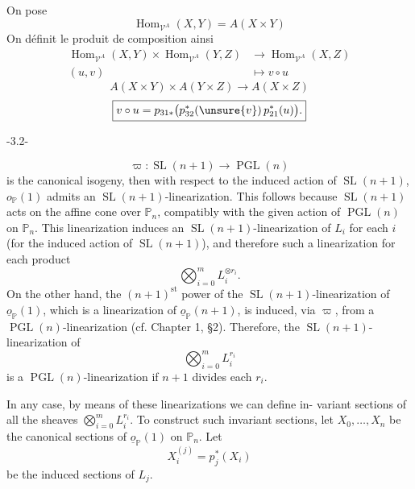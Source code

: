 On pose
\[
\operatorname{Hom}_{\mathcal V^A}(X,Y)=A(X\times Y)
\]
On définit le produit de composition ainsi
\[
\begin{aligned}
\operatorname{Hom}_{\mathcal V^A}(X,Y)\times\operatorname{Hom}_{\mathcal V^A}(Y,Z)&\longrightarrow\operatorname{Hom}_{\mathcal V^A}(X,Z)\\
(u,v)&\longmapsto v\circ u
\end{aligned}
\]
\[
A(X\times Y)\times A(Y\times Z)\longrightarrow A(X\times Z)
\]
\[
\boxed{v\circ u=p_{31*}\bigl(p_{32}^*(\unsure{v})\,p_{21}^*(u)\bigr).}
\]
\begin{center}-3.2-\end{center}
\[
\varpi:\operatorname{SL}(n+1)\longrightarrow\operatorname{PGL}(n)
\]
is the canonical isogeny, then with respect to the induced action of
$\operatorname{SL}(n+1)$, $o_{\mathbb P}(1)$ admits an $\operatorname{SL}(n+1)$-linearization. This follows
because $\operatorname{SL}(n+1)$ acts on the affine cone over $\mathbb P_n$, compatibly with
the given action of $\operatorname{PGL}(n)$ on $\mathbb P_n$. This linearization induces an
$\operatorname{SL}(n+1)$-linearization of $L_i$ for each $i$ (for the induced action of
$\operatorname{SL}(n+1)$), and therefore such a linearization for each product
\[
\bigotimes_{i=0}^{m}L_i^{\otimes r_i}.
\]
On the other hand, the $(n+1)^{\mathrm{st}}$ power of the $\operatorname{SL}(n+1)$-linearization of
$\underline{o}_{\mathbb P}(1)$, which is a linearization of $\underline{o}_{\mathbb P}(n+1)$, is induced, via $\varpi$,
from a $\operatorname{PGL}(n)$-linearization (cf. Chapter 1, §2). Therefore, the
$\operatorname{SL}(n+1)$-linearization of
\[
\bigotimes_{i=0}^{m}L_i^{r_i}
\]
is a $\operatorname{PGL}(n)$-linearization if $n+1$ divides each $r_i$.

In any case, by means of these linearizations we can define in-
variant sections of all the sheaves $\bigotimes_{i=0}^{m}L_i^{r_i}$. To construct such
invariant sections, let $X_0,\ldots,X_n$ be the canonical sections of $\underline{o}_{\mathbb P}(1)$
on $\mathbb P_n$. Let
\[
X_i^{(j)}=p_j^*(X_i)
\]
be the induced sections of $L_j$.


